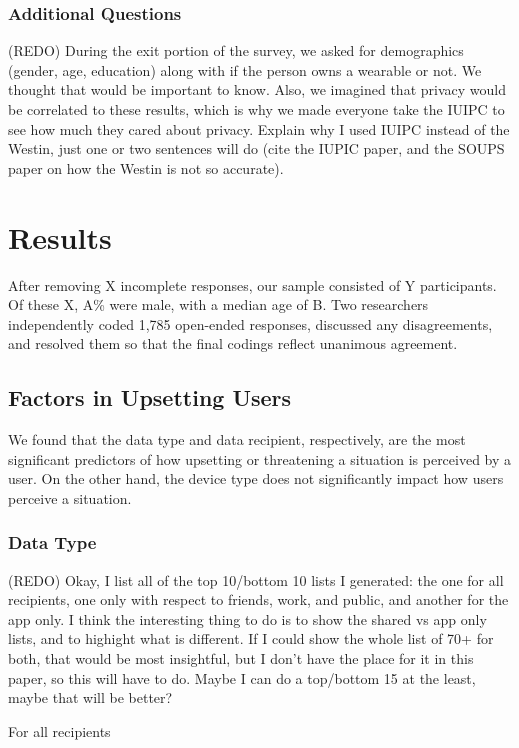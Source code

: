 \documentclass{acm_proc_article-sp}
\begin{document}
\subsubsection{Additional Questions}
(REDO) During the exit portion of the survey, we asked for demographics (gender, age, education) along with if the person owns a wearable or not. We thought that would be important to know. Also, we imagined that privacy would be correlated to these results, which is why we made everyone take the IUIPC to see how much they cared about privacy. Explain why I used IUIPC instead of the Westin, just one or two sentences will do (cite the IUPIC paper, and the SOUPS paper on how the Westin is not so accurate). 


\section{Results}
After removing X incomplete responses, our sample consisted of Y participants. Of these X, A\% were male, with a median age of B. Two researchers independently coded 1,785 open-ended responses, discussed any disagreements, and resolved them so that the final codings reflect unanimous agreement. 

\subsection{Factors in Upsetting Users}
We found that the data type and data recipient, respectively, are the most significant predictors of how upsetting or threatening a situation is perceived by a user. On the other hand, the device type does not significantly impact how users perceive a situation.

\subsubsection{Data Type}
(REDO) Okay, I list all of the top 10/bottom 10 lists I generated: the one for all recipients, one only with respect to friends, work, and public, and another for the app only. I think the interesting thing to do is to show the shared vs app only lists, and to highight what is different. If I could show the whole list of 70+ for both, that would be most insightful, but I don't have the place for it in this paper, so this will have to do. Maybe I can do a top/bottom 15 at the least, maybe that will be better? 

For all recipients \\[-.8cm]
\end{document}
